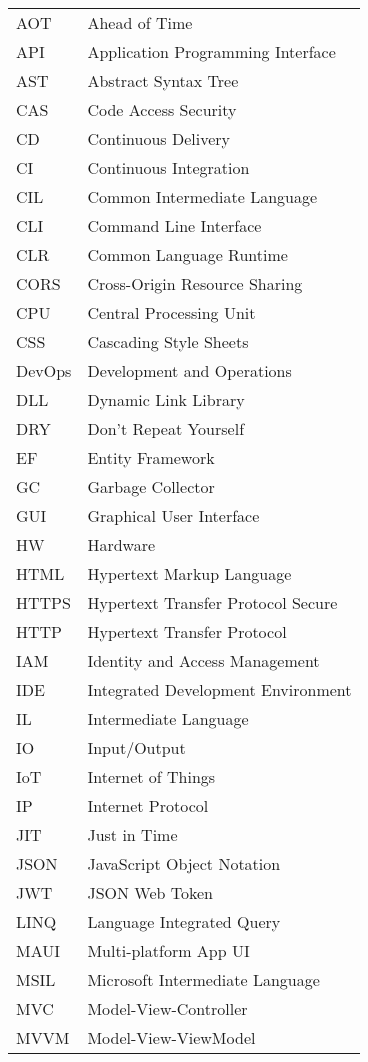 
\seznamzkr

\begin{tabular}{ll}
AOT & Ahead of Time \\
API & Application Programming Interface \\
AST & Abstract Syntax Tree \\
CAS & Code Access Security \\
CD & Continuous Delivery \\
CI & Continuous Integration \\
CIL & Common Intermediate Language \\
CLI & Command Line Interface \\
CLR & Common Language Runtime \\
CORS & Cross-Origin Resource Sharing \\
CPU & Central Processing Unit \\
CSS & Cascading Style Sheets \\
DevOps & Development and Operations \\
DLL & Dynamic Link Library \\
DRY & Don't Repeat Yourself \\
EF & Entity Framework \\
GC & Garbage Collector \\
GUI & Graphical User Interface \\
HW & Hardware \\
HTML & Hypertext Markup Language \\
HTTPS & Hypertext Transfer Protocol Secure \\
HTTP & Hypertext Transfer Protocol \\
IAM & Identity and Access Management \\
IDE & Integrated Development Environment \\
IL & Intermediate Language \\
IO & Input/Output \\
IoT & Internet of Things \\
IP & Internet Protocol \\
JIT & Just in Time \\
JSON & JavaScript Object Notation \\
JWT & JSON Web Token \\
LINQ & Language Integrated Query \\
MAUI & Multi-platform App UI \\
MSIL & Microsoft Intermediate Language \\
MVC & Model-View-Controller \\
MVVM & Model-View-ViewModel \\
\end{tabular}

